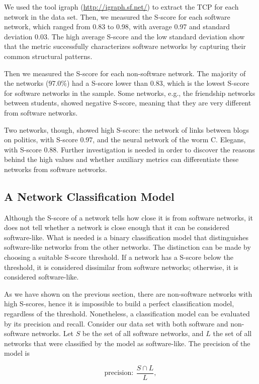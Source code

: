 We used the tool igraph (\url{http://igraph.sf.net/}) to extract the TCP for
each network in the data set. Then, we measured the S-score for each software
network, which ranged from 0.83 to 0.98, with average 0.97 and standard
deviation 0.03. The high average S-score and the low standard deviation show
that the metric successfully characterizes software networks by capturing their
common structural patterns.

Then we measured the S-score for each non-software network. The majority of the
networks (97.0\%) had a S-score lower than 0.83, which is the lowest S-score
for software networks in the sample. Some networks, e.g., the friendship
networks between students, showed negative S-score, meaning that they are very
different from software networks.

Two networks, though, showed high S-score: the network of links between blogs
on politics, with S-score 0.97, and the neural network of the worm C. Elegans,
with S-score 0.88. Further investigation is needed in order to discover the
reasons behind the high values and whether auxiliary metrics can differentiate
these networks from software networks.

\subsection{A Network Classification Model} \label{sec:classmodel} %
Although the S-score of a network tells how close it is from software networks,
it does not tell whether a network is close enough that it can be considered
software-like. What is needed is a binary classification model that
distinguishes software-like networks from the other networks. The distinction
can be made by choosing a suitable S-score threshold. If a network has a S-score
below the threshold, it is considered dissimilar from software networks;
otherwise, it is considered software-like.

As we have shown on the previous section, there are non-software networks with
high S-scores, hence it is impossible to build a perfect classification model,
regardless of the threshold. Nonetheless, a classification model can be
evaluated by its precision and recall. Consider our data set with both software
and non-software networks. Let $S$ be the set of all software networks, and $L$
the set of all networks that were classified by the model as software-like. The
precision of the model is

$$
\mathrm{precision}: ~\frac{S \cap L}{L},
$$

